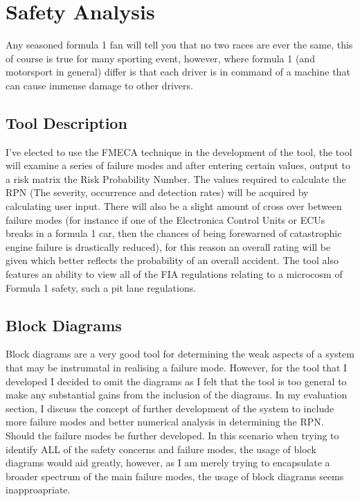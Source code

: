 \documentclass[12pt]{article} %
\begin{document}



\section{Safety Analysis} %

Any seasoned formula 1 fan will tell you that no two races are ever the same, this of course is true for many sporting event, however, where formula 1 (and motorsport in general) differ is that each driver is in command of a machine that can cause immense damage to other drivers.


\subsection{Tool Description}

I've elected to use the FMECA technique in the development of the tool, the tool will examine a series of failure modes and after entering certain values, output to a risk matrix the Risk Probability Number. The values required to calculate the RPN (The severity, occurrence and detection rates) will be acquired by calculating user input. There will also be a slight amount of cross over between failure modes (for instance if one of the Electronica Control Units or ECUs breaks in a formula 1 car, then the chances of being forewarned of catastrophic engine failure is drastically reduced), for this reason an overall rating will be given which better reflects the probability of an overall accident. The tool also features an ability to view all of the FIA regulations relating to a microcosm of Formula 1 safety, such a pit lane regulations.

\subsection{Block Diagrams}

Block diagrams are a very good tool for determining the weak aspects of a system that may be instrumatal in realising a failure mode. However, for the tool that I developed I decided to omit the diagrams as I felt that the tool is too general to make any substantial gains from the inclusion of the diagrams. In my evaluation section, I discuss the concept of further development of the system to include more failure modes and better numerical analysis in determining the RPN. Should the failure modes be further developed. In this scenario when trying to identify ALL of the safety concerns and failure modes, the usage of block diagrams would aid greatly, however, as I am merely trying to encapsulate a broader spectrum of the main failure modes, the usage of block diagrams seems inapproapriate.
\end{document}
